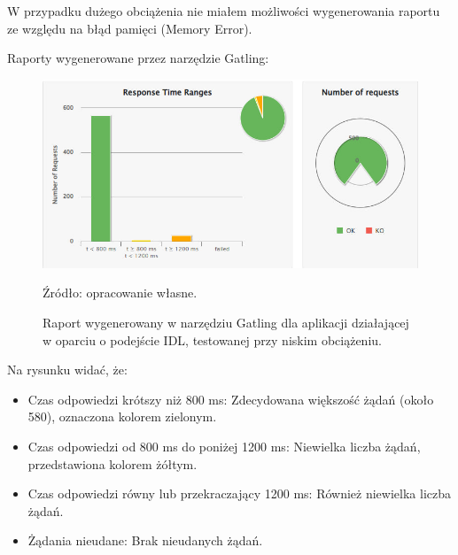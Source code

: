 \documentclass[runningheads,12pt]{llncs}
\begin{document}
W przypadku dużego obciążenia nie miałem możliwości wygenerowania raportu ze względu na błąd pamięci (Memory Error).

\newpage


Raporty wygenerowane przez narzędzie Gatling: 

\begin{figure}
    \includegraphics[width=\linewidth]{images/idl-low-gatling-graph.jpg}
    \caption{Raport wygenerowany w narzędziu Gatling dla aplikacji działającej w oparciu o podejście IDL, testowanej przy niskim obciążeniu.} \label{fig1}
    \vspace{0.5em}
    {\small Źródło: opracowanie własne.}
\end{figure}

Na rysunku widać, że:

\begin{itemize}
    \item Czas odpowiedzi krótszy niż 800 ms: Zdecydowana większość żądań (około 580), oznaczona kolorem zielonym.
    \item Czas odpowiedzi od 800 ms do poniżej 1200 ms: Niewielka liczba żądań, przedstawiona kolorem żółtym.
    \item Czas odpowiedzi równy lub przekraczający 1200 ms: Również niewielka liczba żądań.
    \item Żądania nieudane: Brak nieudanych żądań.
\end{itemize}

\newpage
\end{document}

